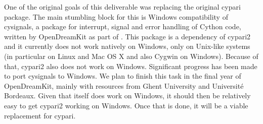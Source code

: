 \documentclass{deliverablereport}
\begin{document}
One of the original goals of this deliverable was replacing the original
cypari package.
The main stumbling block for this is Windows compatibility of cysignals,
a package for interrupt, signal and error handling
of Cython code, written by OpenDreamKit as part of .
This package is a dependency of cypari2 and it
currently does not work natively on Windows,
only on Unix-like systems
(in particular on Linux and Mac OS X and also Cygwin on Windows).
Because of that, cypari2 also does not work on Windows.
Significant progress has been made to port cysignals to Windows.
We plan to finish this task in the final year of OpenDreamKit,
mainly with resources from Ghent University and Universit\'e Bordeaux.
Given that \PariGP itself does work on Windows,
it should then be relatively easy to get cypari2 working on Windows.
Once that is done, it will be a viable replacement for cypari.
\end{document}
